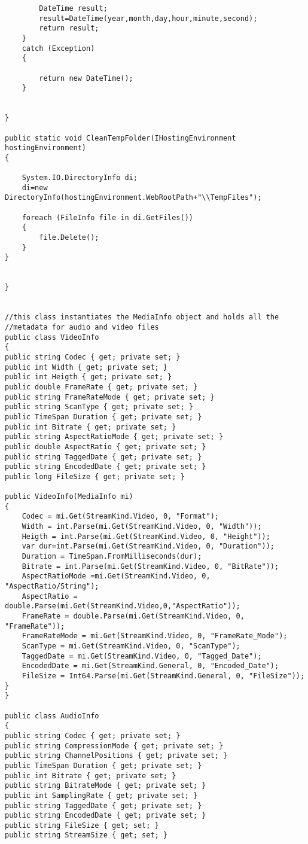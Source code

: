 \begin{lstlisting}
		DateTime result;
		result=DateTime(year,month,day,hour,minute,second);
		return result;
	}
	catch (Exception)
	{

		return new DateTime();
	}


}

public static void CleanTempFolder(IHostingEnvironment hostingEnvironment)
{

	System.IO.DirectoryInfo di;
	di=new DirectoryInfo(hostingEnvironment.WebRootPath+"\\TempFiles");

	foreach (FileInfo file in di.GetFiles())
	{
		file.Delete();
	}
}


}


//this class instantiates the MediaInfo object and holds all the 
//metadata for audio and video files
public class VideoInfo
{
public string Codec { get; private set; }
public int Width { get; private set; }
public int Heigth { get; private set; }
public double FrameRate { get; private set; }
public string FrameRateMode { get; private set; }
public string ScanType { get; private set; }
public TimeSpan Duration { get; private set; }
public int Bitrate { get; private set; }
public string AspectRatioMode { get; private set; }
public double AspectRatio { get; private set; }
public string TaggedDate { get; private set; }
public string EncodedDate { get; private set; }
public long FileSize { get; private set; }

public VideoInfo(MediaInfo mi)
{
	Codec = mi.Get(StreamKind.Video, 0, "Format");
	Width = int.Parse(mi.Get(StreamKind.Video, 0, "Width"));
	Heigth = int.Parse(mi.Get(StreamKind.Video, 0, "Height"));
	var dur=int.Parse(mi.Get(StreamKind.Video, 0, "Duration"));
	Duration = TimeSpan.FromMilliseconds(dur);
	Bitrate = int.Parse(mi.Get(StreamKind.Video, 0, "BitRate"));
	AspectRatioMode =mi.Get(StreamKind.Video, 0, "AspectRatio/String"); 
	AspectRatio = double.Parse(mi.Get(StreamKind.Video,0,"AspectRatio"));
	FrameRate = double.Parse(mi.Get(StreamKind.Video, 0, "FrameRate"));
	FrameRateMode = mi.Get(StreamKind.Video, 0, "FrameRate_Mode");
	ScanType = mi.Get(StreamKind.Video, 0, "ScanType");
	TaggedDate = mi.Get(StreamKind.Video, 0, "Tagged_Date");
	EncodedDate = mi.Get(StreamKind.General, 0, "Encoded_Date");
	FileSize = Int64.Parse(mi.Get(StreamKind.General, 0, "FileSize"));
}
}

public class AudioInfo
{
public string Codec { get; private set; }
public string CompressionMode { get; private set; }
public string ChannelPositions { get; private set; }
public TimeSpan Duration { get; private set; }
public int Bitrate { get; private set; }
public string BitrateMode { get; private set; }
public int SamplingRate { get; private set; }
public string TaggedDate { get; private set; }
public string EncodedDate { get; private set; }
public string FileSize { get; set; }
public string StreamSize { get; set; }


\end{lstlisting}
